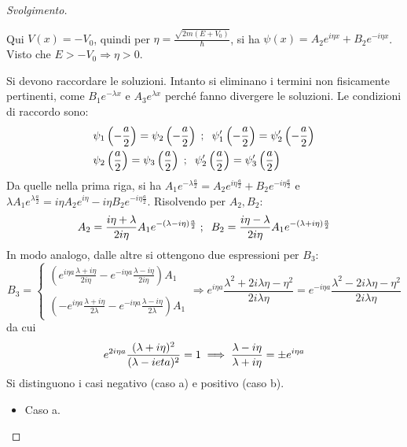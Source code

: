 \documentclass[11pt, a4paper]{scrartcl} %
\numberwithin{equation}{subsection}
\theoremstyle{style2}
\theoremstyle{style1}
\renewcommand\qedsymbol{$\blacksquare$}
\newenvironment{svolgimento}{\renewcommand\qedsymbol{$\spadesuit$}\begin{proof}[Svolgimento]}{\end{proof}}
\begin{document}
\begin{svolgimento}
\begin{itemize}
		Qui $V(x) = - V_0$, quindi per $\eta = \frac{\sqrt{2m (E+V_0)} }{\hbar }$, si ha $\psi (x) = A_2e^{i\eta x}  + B_2 e^{-i\eta x} $. Visto che $E>-V_0\Rightarrow \eta>0$.
\end{itemize}
Si devono raccordare le soluzioni. Intanto si eliminano i termini non fisicamente pertinenti, come $B_1 e^{- \lambda x} $ e $A_3 e^{\lambda  x} $ perch\'e fanno divergere le soluzioni. Le condizioni di raccordo sono:
\[
\begin{split}
	&\psi _1\left(-\frac{a}{2}\right) = \psi _2 \left(-\frac{a}{2}\right) \hspace{.1cm}; \hspace{.2cm}\psi _1'\left(-\frac{a}{2}\right) = \psi _2 '\left(-\frac{a}{2}\right) \\
	&\psi _2\left(\frac{a}{2}\right) = \psi _3 \left(\frac{a}{2}\right) \hspace{.1cm}; \hspace{.2cm}\psi _2'\left(\frac{a}{2}\right) = \psi _3 '\left(\frac{a}{2}\right) 
\end{split}
\] 
Da quelle nella prima riga, si ha $A_1 e^{- \lambda  \frac{a}{2}} = A_2 e^{i\eta \frac{a}{2}} + B_2 e^{-i\eta \frac{a}{2}} $ e $\lambda  A_1 e^{ \lambda  \frac{a}{2}} = i\eta A_2 e^{i\eta }  - i\eta B_2 e^{-i\eta \frac{a}{2}} $. Risolvendo per $A_2,B_2$:
\[
	A_2 = \frac{i\eta +\lambda }{2 i\eta }A_1 e^{- (\lambda -i\eta) \frac{a}{2}} \hspace{.1cm} ; \hspace{.2cm} B_2 = \frac{i\eta -\lambda }{2 i\eta }A_1 e^{- (\lambda +i\eta) \frac{a}{2}} 
\] 
In modo analogo, dalle altre si ottengono due espressioni per $B_3$:
\[
B_3 = \begin{cases}
	\displaystyle \left(e^{i\eta a }\frac{\lambda + i\eta}{2 i \eta} - e^{-i\eta a } \frac{\lambda  - i\eta}{2i\eta}\right) A_1 \\
	\\
	\displaystyle \left(-e^{i\eta a } \frac{\lambda + i\eta}{2 \lambda }- e^{-i\eta a } \frac{\lambda  - i\eta}{2\lambda }\right) A_1 
\end{cases} \Rightarrow e^{i\eta a} \frac{\lambda ^2 + 2i\lambda \eta - \eta^2}{2 i \lambda \eta} = e^{-i\eta a} \frac{\lambda ^2 - 2i\lambda \eta - \eta^2}{2i\lambda \eta}
\] 
da cui
\begin{equation}
	e^{2i \eta a} \frac{(\lambda +i\eta)^2}{(\lambda -i\\eta)^2} = 1 \implies \frac{\lambda - i\eta}{\lambda  + i\eta} = \pm e^{i \eta a} 
\end{equation}
Si distinguono i casi negativo (caso a) e positivo (caso b).
\begin{itemize}
	\item Caso a.


\end{itemize}
\end{svolgimento}
\end{document}

